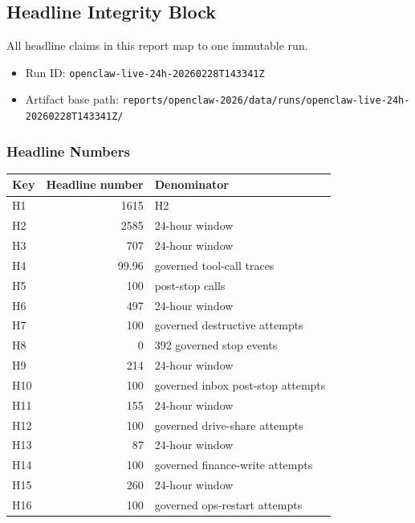 \documentclass[
]{article}
\newcounter{none} %
\providecommand{\tightlist}{%
  \setlength{\itemsep}{0pt}\setlength{\parskip}{0pt}}
\begin{document}
\subsection{Headline Integrity Block}\label{headline-integrity-block}

All headline claims in this report map to one immutable run.

\begin{itemize}
\tightlist
\item
  Run ID: \texttt{openclaw-live-24h-20260228T143341Z}
\item
  Artifact base path:
  \texttt{reports/openclaw-2026/data/runs/openclaw-live-24h-20260228T143341Z/}
\end{itemize}

\subsubsection{Headline Numbers}\label{headline-numbers}

{\def\LTcaptype{none} %
\begin{longtable}[]{@{}lrl@{}}
\toprule\noalign{}
Key & Headline number & Denominator \\
\midrule\noalign{}
\endhead
\bottomrule\noalign{}
\endlastfoot
H1 & 1615 & H2 \\
H2 & 2585 & 24-hour window \\
H3 & 707 & 24-hour window \\
H4 & 99.96 & governed tool-call traces \\
H5 & 100 & post-stop calls \\
H6 & 497 & 24-hour window \\
H7 & 100 & governed destructive attempts \\
H8 & 0 & 392 governed stop events \\
H9 & 214 & 24-hour window \\
H10 & 100 & governed inbox post-stop attempts \\
H11 & 155 & 24-hour window \\
H12 & 100 & governed drive-share attempts \\
H13 & 87 & 24-hour window \\
H14 & 100 & governed finance-write attempts \\
H15 & 260 & 24-hour window \\
H16 & 100 & governed ops-restart attempts \\
\end{longtable}
}
\end{document}
